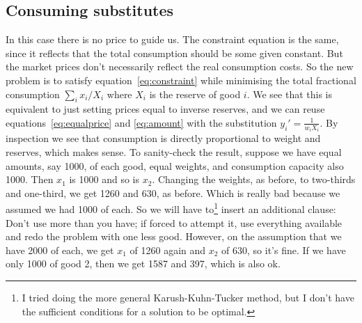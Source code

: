 
\subsection{Consuming substitutes}

In this case there is no price to guide us. The constraint equation is
the same, since it reflects that the total consumption should be some
given constant. But the market prices don't necessarily reflect the
real consumption costs. So the new problem is to satisfy equation~\ref{eq:constraint}
while minimising the total fractional consumption $\sum\limits_i
x_i/X_i$ where $X_i$ is the reserve of good $i$. We see that this is
equivalent to just setting prices equal to inverse reserves, and we
can reuse equations~\ref{eq:equalprice} and \ref{eq:amount} with the
substitution $y_i' = \frac{1}{w_iX_i}$. By inspection we see that
consumption is directly proportional to weight and reserves, which
makes sense. To sanity-check the result, suppose we have equal
amounts, say 1000, of each good, equal weights, and consumption
capacity also 1000. Then $x_1$ is 1000 and so is $x_2$. Changing the
weights, as before, to two-thirds and one-third, we get 1260 and 630,
as before. Which is really bad because we assumed we had 1000 of
each. So we will have to\footnote{I tried doing the more general
  Karush-Kuhn-Tucker method, but I don't have the sufficient
  conditions for a solution to be optimal.} insert an additional clause: Don't use more
than you have; if forced to attempt it, use everything available and redo
the problem with one less good. However, on the assumption that we
have 2000 of each, we get $x_1$ of 1260 again and $x_2$ of 630, so
it's fine. If we have only 1000 of good 2, then we get 1587 and 397,
which is also ok.


